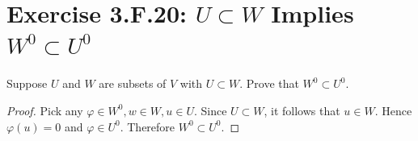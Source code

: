 \section{Exercise 3.F.20: $U\subset W$ Implies $W^0\subset U^0$}
Suppose $U$ and $W$ are subsets of $V$ with $U\subset W$. Prove that $W^0\subset U^0$.
\begin{proof}
Pick any $\varphi\in W^0, w\in W, u\in U$. Since $U\subset W$, it follows that $u\in W$. Hence $\varphi(u)=0$ and $\varphi\in U^0$. Therefore $W^0\subset U^0$.
\end{proof}
